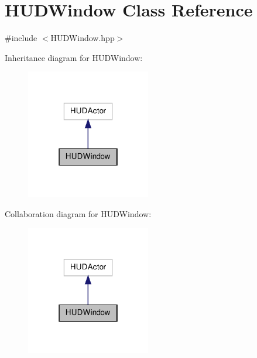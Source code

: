 \hypertarget{class_h_u_d_window}{\section{H\-U\-D\-Window Class Reference}
\label{class_h_u_d_window}
}


{\ttfamily \#include $<$H\-U\-D\-Window.\-hpp$>$}



Inheritance diagram for H\-U\-D\-Window\-:
\nopagebreak
\begin{figure}[H]
\begin{center}
\leavevmode
\includegraphics[width=154pt]{class_h_u_d_window__inherit__graph}
\end{center}
\end{figure}


Collaboration diagram for H\-U\-D\-Window\-:
\nopagebreak
\begin{figure}[H]
\begin{center}
\leavevmode
\includegraphics[width=154pt]{class_h_u_d_window__coll__graph}
\end{center}
\end{figure}
